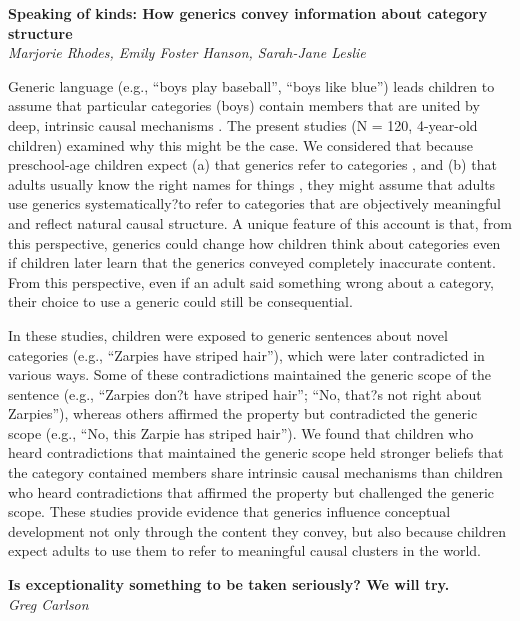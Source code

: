 \documentclass[10pt,letterpaper]{article}
\begin{document}
\noindent\textbf{Speaking of kinds: How generics convey information about category structure} \\
\noindent\emph{Marjorie Rhodes, Emily Foster Hanson, Sarah-Jane Leslie}

Generic language (e.g., ``boys play baseball'', ``boys like blue'') leads children to assume that particular categories (boys) contain members that are united by deep, intrinsic causal mechanisms \cite{gelman2010effects, rhodes2012cultural}. 
The present studies (N = 120, 4-year-old children) examined why this might be the case. 
We considered that because preschool-age children expect (a) that generics refer to categories \cite{gelman2003preschool}, and (b) that adults usually know the right names for things \cite{jaswal2007looks}, they might assume that adults use generics systematically?to refer to categories that are objectively meaningful and reflect natural causal structure. 
A unique feature of this account is that, from this perspective, generics could change how children think about categories even if children later learn that the generics conveyed completely inaccurate content. 
From this perspective, even if an adult said something wrong about a category, their choice to use a generic could still be consequential.

In these studies, children were exposed to generic sentences about novel categories (e.g., ``Zarpies have striped hair''), which were later contradicted in various ways. 
Some of these contradictions maintained the generic scope of the sentence (e.g., ``Zarpies don?t have striped hair''; ``No, that?s not right about Zarpies''), whereas others affirmed the property but contradicted the generic scope (e.g., ``No, this Zarpie has striped hair''). 
We found that children who heard contradictions that maintained the generic scope held stronger beliefs that the category contained members share intrinsic causal mechanisms than children who heard contradictions that affirmed the property but challenged the generic scope. 
These studies provide evidence that generics influence conceptual development not only through the content they convey, but also because children expect adults to use them to refer to meaningful causal clusters in the world.

\noindent\textbf{Is exceptionality something to be taken seriously?  We will try.} \\
\noindent\emph{Greg Carlson}
\end{document}
